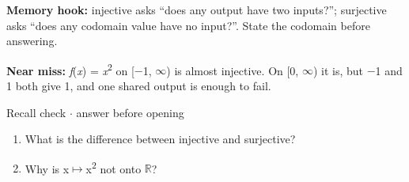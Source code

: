 \documentclass[11pt]{article}
\begin{document}
\begin{keepsection}
\begin{notebox}\textbf{Memory hook:} injective asks “does any output have two inputs?”; surjective asks “does any codomain value have no input?”. State the codomain before answering.\end{notebox}

\begin{notebox}\textbf{Near miss:} \textit{f}(\textit{x}) = \textit{x}\textsuperscript{2} on [\ensuremath{-}1, \ensuremath{\infty}) is almost injective. On [0, \ensuremath{\infty}) it is, but \ensuremath{-}1 and 1 both give 1, and one shared output is enough to fail.\end{notebox}

\begin{recallbox}{Recall check \ensuremath{\cdot} answer before opening}
\begin{enumerate}
\item What is the difference between injective and surjective?
\item Why is x\ensuremath{\mapsto}x\textsuperscript{2} not onto \ensuremath{\mathbb{R}}?
\end{enumerate}

\end{recallbox}
\end{keepsection}
\end{document}
